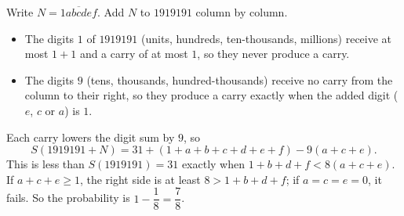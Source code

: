Write $N=\overline{1abcdef}$. Add $N$ to $1919191$ column by column.
\begin{itemize}
\item The digits $1$ of $1919191$ (units, hundreds, ten-thousands, millions) receive at most $1+1$ and a carry of at most $1$, so they never produce a carry.
\item The digits $9$ (tens, thousands, hundred-thousands) receive no carry from the column to their right, so they produce a carry exactly when the added digit ($e$, $c$ or $a$) is $1$.
\end{itemize}
Each carry lowers the digit sum by $9$, so
\[S(1919191+N)=31+(1+a+b+c+d+e+f)-9(a+c+e).\]
This is less than $S(1919191)=31$ exactly when $1+b+d+f<8(a+c+e)$. If $a+c+e\ge1$, the right side is at least $8>1+b+d+f$; if $a=c=e=0$, it fails. So the probability is $1-\dfrac18=\boxed{\dfrac78}$.
